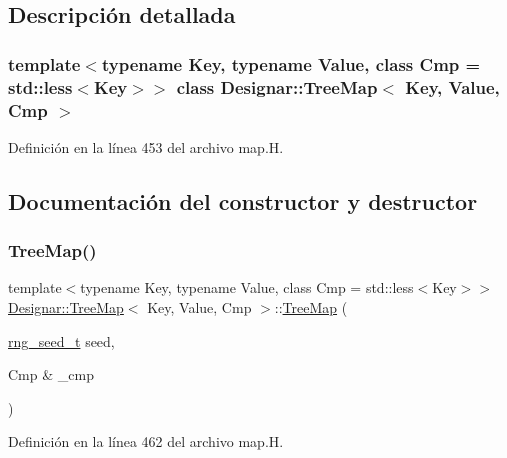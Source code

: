 \subsection{Descripción detallada}
\subsubsection*{template$<$typename Key, typename Value, class Cmp = std\+::less$<$\+Key$>$$>$\newline
class Designar\+::\+Tree\+Map$<$ Key, Value, Cmp $>$}



Definición en la línea 453 del archivo map.\+H.



\subsection{Documentación del constructor y destructor}
\mbox{\label{class_designar_1_1_tree_map_a8f36580c132ec2cf3c1d4cd4ab8a4fa5}} 
\subsubsection{\texorpdfstring{Tree\+Map()}{TreeMap()}\hspace{0.1cm}{\footnotesize\ttfamily [1/7]}}
{\footnotesize\ttfamily template$<$typename Key, typename Value, class Cmp = std\+::less$<$\+Key$>$$>$ \\
\hyperlink{class_designar_1_1_tree_map}{Designar\+::\+Tree\+Map}$<$ Key, Value, Cmp $>$\+::\hyperlink{class_designar_1_1_tree_map}{Tree\+Map} (\begin{DoxyParamCaption}\item[{\hyperlink{namespace_designar_ad621b5646d45288c5d6a1e1dfe7531a8}{rng\+\_\+seed\+\_\+t}}]{seed,  }\item[{Cmp \&}]{\+\_\+cmp }\end{DoxyParamCaption})\hspace{0.3cm}{\ttfamily [inline]}}



Definición en la línea 462 del archivo map.\+H.

\mbox{\label{class_designar_1_1_tree_map_ac0bcb95d2b1a18bd59c98ad89c3dc7a4}} 
